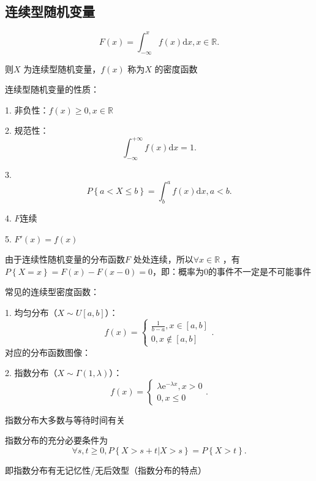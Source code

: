 \subsection{连续型随机变量}%
\label{sub:连续型随机变量}
\begin{defi}
    \[
        F\left( x \right) =\int_{-\infty}^{x} f\left( x \right) \mathrm{d}x,x\in \mathbb{R}
    .\] 

    则$X$ 为连续型随机变量，$f\left( x \right) $ 称为$X$ 的密度函数
\end{defi}
连续型随机变量的性质：

1. 非负性：$f\left( x \right) \ge 0, x\in \mathbb{R}$

2. 规范性： \[
    \int_{-\infty}^{+\infty} f\left( x \right) \mathrm{d}x =1
.\]

3. \[
    P\left\{ a<X\le b \right\} =\int_{b}^{a}f\left( x \right) \mathrm{d}x, a<b
.\] 

4. $F$连续

5. $F'\left( x \right) =f\left( x \right) $

\begin{notation}
    由于连续性随机变量的分布函数$F$ 处处连续，所以$\forall x\in \mathbb{R}$ ，有$P\left\{ X=x \right\} =F\left( x \right) -F\left( x-0 \right) =0$，即：概率为0的事件不一定是不可能事件
\end{notation}
\begin{eg}
    
\end{eg}
常见的连续型密度函数：

1. 均匀分布（$X\sim U\left[ a,b \right] $）：\[
    f\left( x \right) =\begin{cases}
        \displaystyle{\frac{1}{b-a}},x\in \left[ a,b \right] \\
        0,x \not\in \left[ a,b \right] 
    \end{cases}
.\] 
对应的分布函数图像：
\begin{center}
\end{center}

2. 指数分布（$X\sim \Gamma\left( 1,\lambda \right) $）：\[
    f\left( x \right) =\begin{cases}
        \lambda\mathrm{e}^{-\lambda x},x>0\\
        0,x\le 0
    \end{cases}
.\] 
\begin{notation}
    指数分布大多数与等待时间有关

    指数分布的充分必要条件为\[
        \forall s,t\ge 0,P\left\{ X>s+t|X>s \right\} =P\left\{ X>t \right\} 
    .\] 

    即指数分布有无记忆性/无后效型（指数分布的特点）
\end{notation}

